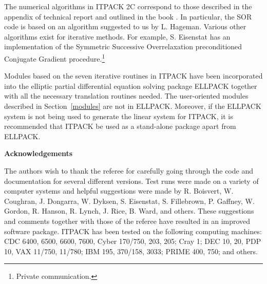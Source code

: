 The numerical algorithms in ITPACK 2C correspond to those described in
the appendix of technical report \cite{5} and outlined in the book 
\cite{7}.  In particular, the SOR code is based on an algorithm 
suggested to us by L. Hageman.  Various other algorithms exist for 
iterative methods.  For example, S. Eisenstat has an implementation 
of the Symmetric Successive Overrelaxation preconditioned Conjugate 
Gradient procedure.\footnote{Private communication.}
 
Modules based on the seven iterative routines in ITPACK have been
incorporated into the elliptic partial differential equation solving
package ELLPACK \cite{17} together with all the necessary translation
routines needed.  The user-oriented modules described in 
Section~\ref{modules} are
not in ELLPACK.  Moreover, if the ELLPACK system is not being used to
generate the linear system for ITPACK, it is recommended that ITPACK 
be used as a stand-alone package apart from ELLPACK.
 
\bigskip
\noindent
{\bf Acknowledgements}
\bigskip
 
The authors wish to thank the referee for carefully going through the
code and documentation for several different versions.  Test runs were
made on a variety of computer systems and helpful suggestions were made
by R. Boisvert, W. Coughran, J. Dongarra, W. Dyksen, S. Eisenstat,
S. Fillebrown, P. Gaffney, W. Gordon, R. Hanson, R. Lynch, J. Rice,
B. Ward, and others.  These suggestions and comments together with those
of the referee have resulted in an improved software package.  ITPACK
has been tested on the following computing machines: CDC 6400, 6500,
6600, 7600, Cyber 170/750, 203, 205; Cray 1; DEC 10, 20, PDP 10, VAX
11/750, 11/780; IBM 195, 370/158, 3033; PRIME 400, 750; and others.
 
